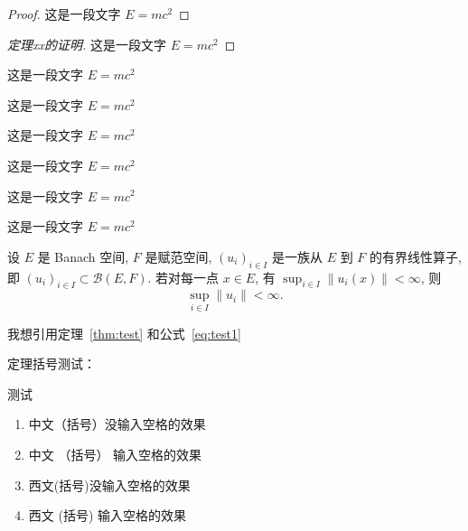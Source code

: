 \begin{proof}
    这是一段文字 $E = m c^2$
\end{proof}

\begin{proof}[定理xx的证明]
    这是一段文字 $E = m c^2$
\end{proof}

\begin{example}
    这是一段文字 $E = m c^2$
\end{example}

\begin{property}
    这是一段文字 $E = m c^2$
\end{property}

\begin{corollary}
    这是一段文字 $E = m c^2$
\end{corollary}

\begin{lemma}
    这是一段文字 $E = m c^2$
\end{lemma}

\begin{remark}
    这是一段文字 $E = m c^2$
\end{remark}

\begin{axiom}
    这是一段文字 $E = m c^2$
\end{axiom}

\begin{theorem}\label{thm:test}
    设 $E$ 是 Banach 空间, $F$ 是赋范空间, $(u_i)_{i\in I}$ 是一族从 $E$ 到 $F$ 的有界线性算子,
    即 $(u_i)_{i\in I}\subset \mathcal{B}(E,F)$. 若对每一点 $x\in E$, 有
    $\sup_{i\in I} \|u_i(x)\|<\infty$, 则
    \begin{equation}\label{eq:test1}
        \sup_{i\in I} \|u_i\| < \infty.
    \end{equation}
\end{theorem}

我想引用定理~\ref{thm:test} 和公式~\ref{eq:test1}

定理括号测试：

\begin{theorem}
    测试
    \begin{enumerate}
        \item 中文（括号）没输入空格的效果
        \item 中文 （括号） 输入空格的效果
        \item 西文(括号)没输入空格的效果
        \item 西文 (括号) 输入空格的效果
    \end{enumerate}
\end{theorem}

